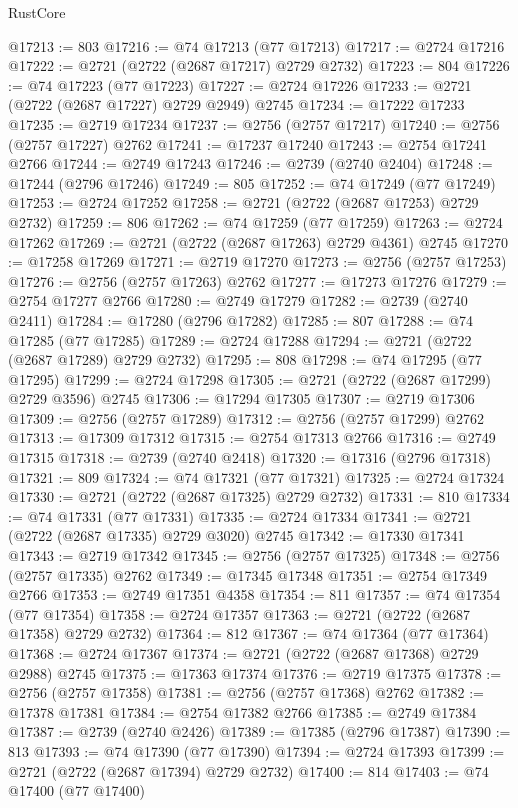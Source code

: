 \begin{lexlean}{RustCore}
\begin{coremodule}
@17213 := 803
@17216 := @74 @17213 (@77 @17213)
@17217 := @2724 @17216
@17222 := @2721 (@2722 (@2687 @17217) @2729 @2732)
@17223 := 804
@17226 := @74 @17223 (@77 @17223)
@17227 := @2724 @17226
@17233 := @2721 (@2722 (@2687 @17227) @2729 @2949) @2745
@17234 := @17222 @17233
@17235 := @2719 @17234
@17237 := @2756 (@2757 @17217)
@17240 := @2756 (@2757 @17227) @2762
@17241 := @17237 @17240
@17243 := @2754 @17241 @2766
@17244 := @2749 @17243
@17246 := @2739 (@2740 @2404)
@17248 := @17244 (@2796 @17246)
@17249 := 805
@17252 := @74 @17249 (@77 @17249)
@17253 := @2724 @17252
@17258 := @2721 (@2722 (@2687 @17253) @2729 @2732)
@17259 := 806
@17262 := @74 @17259 (@77 @17259)
@17263 := @2724 @17262
@17269 := @2721 (@2722 (@2687 @17263) @2729 @4361) @2745
@17270 := @17258 @17269
@17271 := @2719 @17270
@17273 := @2756 (@2757 @17253)
@17276 := @2756 (@2757 @17263) @2762
@17277 := @17273 @17276
@17279 := @2754 @17277 @2766
@17280 := @2749 @17279
@17282 := @2739 (@2740 @2411)
@17284 := @17280 (@2796 @17282)
@17285 := 807
@17288 := @74 @17285 (@77 @17285)
@17289 := @2724 @17288
@17294 := @2721 (@2722 (@2687 @17289) @2729 @2732)
@17295 := 808
@17298 := @74 @17295 (@77 @17295)
@17299 := @2724 @17298
@17305 := @2721 (@2722 (@2687 @17299) @2729 @3596) @2745
@17306 := @17294 @17305
@17307 := @2719 @17306
@17309 := @2756 (@2757 @17289)
@17312 := @2756 (@2757 @17299) @2762
@17313 := @17309 @17312
@17315 := @2754 @17313 @2766
@17316 := @2749 @17315
@17318 := @2739 (@2740 @2418)
@17320 := @17316 (@2796 @17318)
@17321 := 809
@17324 := @74 @17321 (@77 @17321)
@17325 := @2724 @17324
@17330 := @2721 (@2722 (@2687 @17325) @2729 @2732)
@17331 := 810
@17334 := @74 @17331 (@77 @17331)
@17335 := @2724 @17334
@17341 := @2721 (@2722 (@2687 @17335) @2729 @3020) @2745
@17342 := @17330 @17341
@17343 := @2719 @17342
@17345 := @2756 (@2757 @17325)
@17348 := @2756 (@2757 @17335) @2762
@17349 := @17345 @17348
@17351 := @2754 @17349 @2766
@17353 := @2749 @17351 @4358
@17354 := 811
@17357 := @74 @17354 (@77 @17354)
@17358 := @2724 @17357
@17363 := @2721 (@2722 (@2687 @17358) @2729 @2732)
@17364 := 812
@17367 := @74 @17364 (@77 @17364)
@17368 := @2724 @17367
@17374 := @2721 (@2722 (@2687 @17368) @2729 @2988) @2745
@17375 := @17363 @17374
@17376 := @2719 @17375
@17378 := @2756 (@2757 @17358)
@17381 := @2756 (@2757 @17368) @2762
@17382 := @17378 @17381
@17384 := @2754 @17382 @2766
@17385 := @2749 @17384
@17387 := @2739 (@2740 @2426)
@17389 := @17385 (@2796 @17387)
@17390 := 813
@17393 := @74 @17390 (@77 @17390)
@17394 := @2724 @17393
@17399 := @2721 (@2722 (@2687 @17394) @2729 @2732)
@17400 := 814
@17403 := @74 @17400 (@77 @17400)

\end{coremodule}
\end{lexlean}

